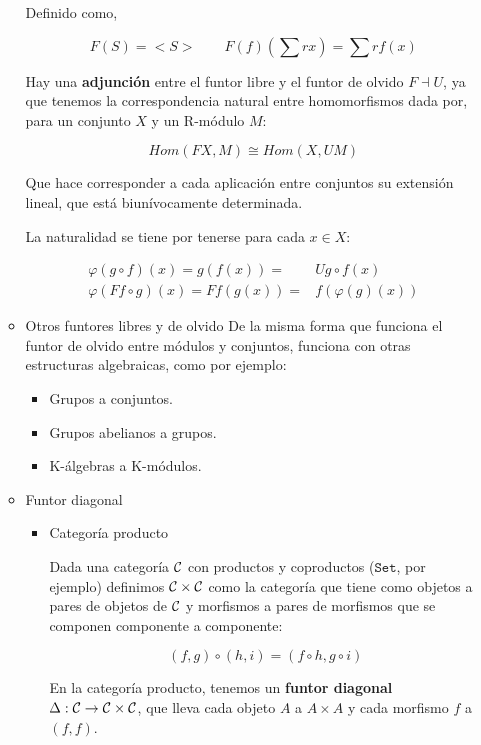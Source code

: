 \documentclass[11pt]{article}
\begin{document}
\begin{itemize}
\begin{itemize}
Definido como, 

\[F(S) = <S> \qquad F(f)\left(\sum rx\right) = \sum rf(x)\]

Hay una \textbf{adjunción} entre el funtor libre y el funtor de olvido
$F \dashv U$, ya que tenemos la correspondencia natural entre homomorfismos
dada por, para un conjunto $X$ y un R-módulo $M$:

\[
Hom(FX,M) \cong Hom(X,UM)
\]

Que hace corresponder a cada aplicación entre conjuntos su extensión
lineal, que está biunívocamente determinada.

La naturalidad se tiene por tenerse para cada $x \in X$:

\[\begin{aligned}
\varphi(g\circ f)(x) = g(f(x)) =& Ug \circ f(x) \\
\varphi(Ff \circ g)(x) = Ff(g(x)) =& f(\varphi(g)(x))
\end{aligned}\]

\item Otros funtores libres y de olvido
\label{sec-7-5-1-6-2}
De la misma forma que funciona el funtor de olvido entre
módulos y conjuntos, funciona con otras estructuras algebraicas,
como por ejemplo:

\begin{itemize}
\item Grupos a conjuntos.
\item Grupos abelianos a grupos.
\item K-álgebras a K-módulos.
\end{itemize}

\item Funtor diagonal
\label{sec-7-5-1-6-3}
\begin{itemize}
\item Categoría producto
\label{sec-7-5-1-6-3-1}
\begin{definition}
Dada una categoría ${\cal C}$ con productos y coproductos ($\mathtt{Set}$, por ejemplo) 
definimos ${\cal C}\times{\cal C}$ como la categoría que tiene como objetos a pares de 
objetos de ${\cal C}$ y morfismos a pares de morfismos que se componen componente
a componente:

\[
(f,g)\circ(h,i) = (f\circ h, g\circ i)
\]
\end{definition}

En la categoría producto, tenemos un \textbf{funtor diagonal} $\Delta : {\cal C} \to {\cal C}\times{\cal C}$, que 
lleva cada objeto $A$ a $A\times A$ y cada morfismo $f$ a $(f,f)$.


\end{itemize}
\end{itemize}
\end{itemize}
\end{document}
